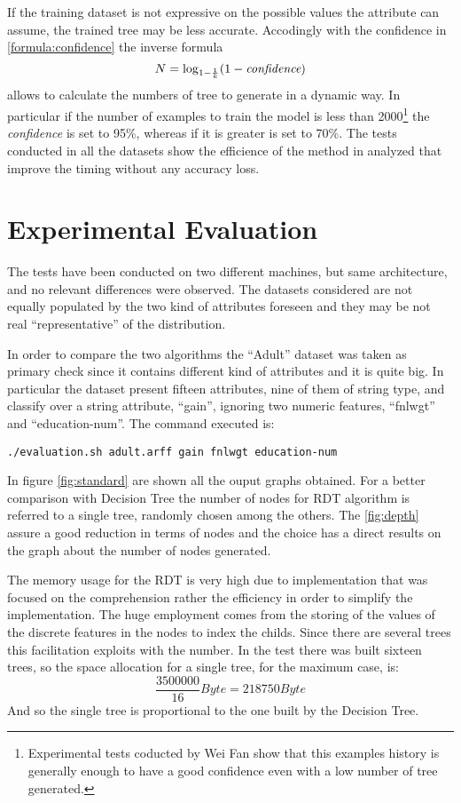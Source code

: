 \documentclass{acm_proc_article-sp-sigmod07}
\begin{document}
If the training dataset is not expressive on the possible values
the attribute can assume, the trained tree may be less accurate.
Accodingly with the confidence in \ref{formula:confidence} the inverse
formula
\begin{equation}
N = \log_{1-\frac{1}{k}}({1 - \emph{confidence}})
\end{equation}
allows to calculate the numbers of tree to generate in a dynamic way. In
 particular if the number of examples to train the model is less than
2000\footnote{Experimental tests coducted by Wei Fan show that this
examples history is generally enough to have a good confidence even with a
low number of tree generated.} the \emph{confidence} is set to 95\%,
whereas if it is greater is set to 70\%. The tests conducted in all the
datasets show the efficience of the method in analyzed that improve the
timing without any accuracy loss.

\section{Experimental Evaluation}
The tests have been conducted on two different machines, but same
architecture, and no relevant differences were observed. The datasets
considered are not equally populated by the two kind of attributes
foreseen and they may be not real ``representative'' of the distribution.

In order to compare the two algorithms the ``Adult'' dataset was taken as
primary check since it contains different kind of attributes and it is
quite big. In particular the dataset present fifteen attributes, nine of
them of string type, and classify over a string attribute, ``gain'',
ignoring two numeric features, ``fnlwgt'' and ``education-num''. The
command executed is:
\begin{verbatim}
./evaluation.sh adult.arff gain fnlwgt education-num
\end{verbatim}

In figure \ref{fig:standard} are shown all the ouput graphs obtained. 
For a better comparison with Decision Tree the number of nodes for RDT
algorithm is referred to a single tree, randomly chosen among the others.
The \ref{fig:depth} assure a good reduction in terms of nodes and the
choice has a direct results on the graph about the number of nodes
generated.

The memory usage for the RDT is very high due to implementation that was
focused on the comprehension rather the efficiency in order to simplify
the implementation. The huge employment comes from the storing of the
values of the discrete features in the nodes to index the childs. Since
there are several trees this facilitation exploits with the number. In the
test there was built sixteen trees, so the space allocation for a single
tree, for the maximum case, is:
$$ \frac{3500000}{16} Byte = 218750 Byte$$
And so the single tree is proportional to the one built by the Decision
Tree.
\end{document}
